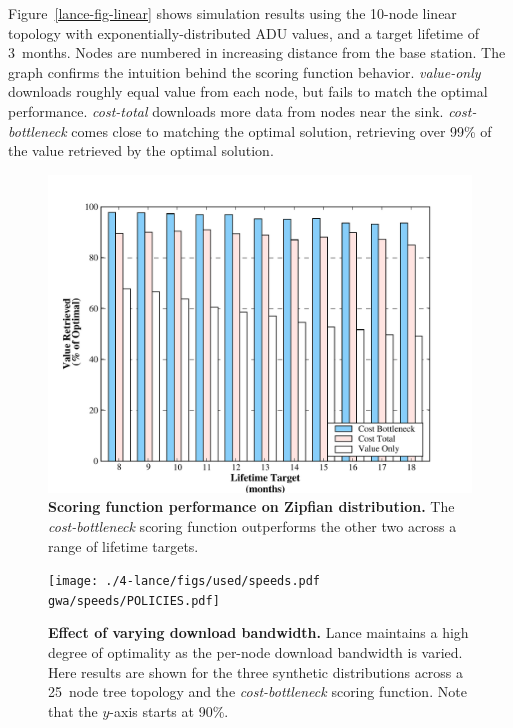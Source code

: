 Figure~\ref{lance-fig-linear} shows simulation results using the 10-node
linear topology with exponentially-distributed ADU values, and a target
lifetime of 3~months. Nodes are numbered in increasing distance from the base
station. The graph confirms the intuition behind the scoring function
behavior. \textit{value-only} downloads roughly equal value from each node,
but fails to match the optimal performance. \textit{cost-total} downloads
more data from nodes near the sink. \textit{cost-bottleneck} comes close to
matching the optimal solution, retrieving over 99\% of the value retrieved by
the optimal solution.

\begin{figure}[t]
\begin{center}
\includegraphics[width=1.0\hsize]{./4-lance/figs/used/zipfian.pdf}
\end{center}

\caption{\textbf{Scoring function performance on Zipfian distribution.} The
\textit{cost-bottleneck} scoring function outperforms the other two across a
range of lifetime targets.}

\label{lance-fig-zipfian}
\end{figure}

\begin{figure}[t]
\begin{center}
\texttt{[image: ./4-lance/figs/used/speeds.pdf gwa/speeds/POLICIES.pdf]}
\end{center}

\caption{\textbf{Effect of varying download bandwidth.} Lance maintains a
high degree of optimality as the per-node download bandwidth is varied. Here
results are shown for the three synthetic distributions across a 25~node tree
topology and the \textit{cost-bottleneck} scoring function. Note that the
$y$-axis starts at 90\%.}

\label{lance-fig-speeds}
\end{figure}


